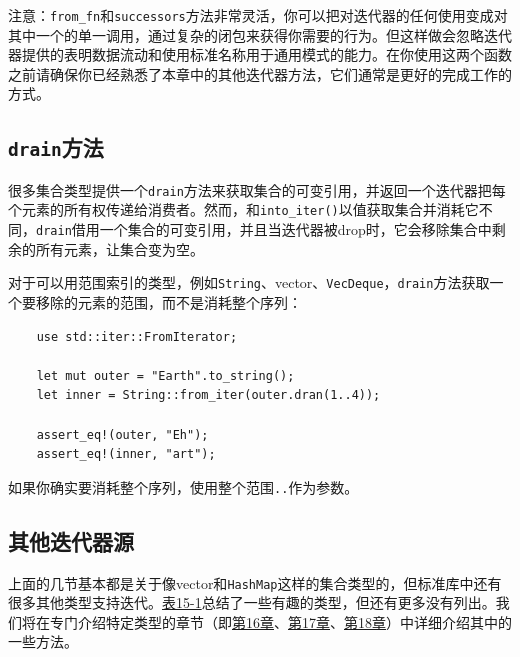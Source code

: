 注意：\texttt{from\_fn}和\texttt{successors}方法非常灵活，你可以把对迭代器的任何使用变成对其中一个的单一调用，通过复杂的闭包来获得你需要的行为。但这样做会忽略迭代器提供的表明数据流动和使用标准名称用于通用模式的能力。在你使用这两个函数之前请确保你已经熟悉了本章中的其他迭代器方法，它们通常是更好的完成工作的方式。

\subsection{\texttt{drain}方法}
很多集合类型提供一个\texttt{drain}方法来获取集合的可变引用，并返回一个迭代器把每个元素的所有权传递给消费者。然而，和\texttt{into\_iter()}以值获取集合并消耗它不同，\texttt{drain}借用一个集合的可变引用，并且当迭代器被drop时，它会移除集合中剩余的所有元素，让集合变为空。

对于可以用范围索引的类型，例如\texttt{String}、vector、\texttt{VecDeque}，\texttt{drain}方法获取一个要移除的元素的范围，而不是消耗整个序列：
\begin{verbatim}
    use std::iter::FromIterator;

    let mut outer = "Earth".to_string();
    let inner = String::from_iter(outer.dran(1..4));

    assert_eq!(outer, "Eh");
    assert_eq!(inner, "art");
\end{verbatim}

如果你确实要消耗整个序列，使用整个范围\texttt{..}作为参数。

\subsection{其他迭代器源}
上面的几节基本都是关于像vector和\texttt{HashMap}这样的集合类型的，但标准库中还有很多其他类型支持迭代。\hyperref[t15-1]{表15-1}总结了一些有趣的类型，但还有更多没有列出。我们将在专门介绍特定类型的章节（即\hyperref[ch16]{第16章}、\hyperref[ch17]{第17章}、\hyperref[ch18]{第18章}）中详细介绍其中的一些方法。

